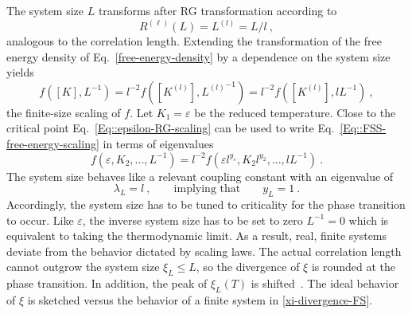 	The system size $L$ transforms after RG transformation according to
	\begin{equation}
		R^{(\ell)}(L) =	L^{(l)} =	L /	l ~,
	\end{equation}
	analogous to the correlation length. Extending the transformation of the free energy density of Eq.~\eqref{free-energy-density} by a dependence on the system size yields
	\begin{equation}\label{Eq::FSS-free-energy-scaling}
		f\left([K], L^{-1}\right) =	l^{-2} f\left([K^{(l)}], {L^{(l)}}^{-1}\right) = l^{-2} f\left([K^{(l)}], l{L}^{-1}\right)	 ~,
	\end{equation}
	the finite-size scaling of $f$.
	Let $K_1 =	\varepsilon$ be the reduced temperature. Close to the critical point Eq.~\eqref{Eq::epsilon-RG-scaling} can be used to write Eq.~\eqref{Eq::FSS-free-energy-scaling} in terms of eigenvalues
	\begin{equation}
		f\left(\varepsilon, K_2, ..., L^{-1}\right) = l^{-2} f\left(\varepsilon l^{y_\varepsilon}, K_2 l^{y_2}, ..., l{L}^{-1}\right)	 ~.
	\end{equation}
	The system size behaves like a relevant coupling constant with an eigenvalue of
	\begin{equation}
		\lambda_L =	l~, \qquad \text{implying that} \qquad y_L =	1 ~.
	\end{equation}
	Accordingly, the system size has to be tuned to criticality for the phase transition to occur. Like $\varepsilon$, the inverse system size has to be set to zero $L^{-1} =	0$ which is equivalent to taking the thermodynamic limit. As a result, real, finite systems deviate from the behavior dictated by scaling laws. The actual correlation length cannot outgrow the system size $\xi_L \leq L$, so the divergence of $\xi$ is rounded at the phase transition. In addition,  the peak of $\xi_L(T)$ is shifted~\cite{domb1983vol8}. The ideal behavior of $\xi$ is sketched versus the behavior of a finite system in  \autoref{xi-divergence-FS}. \\
		
